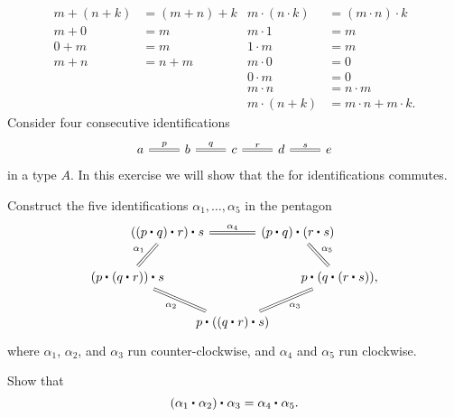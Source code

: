 \begin{exercises}
  \begin{align*}
    m+(n+k) & =(m+n)+k & m\cdot (n\cdot k) & = (m\cdot n)\cdot k \\
    m+0 & = m & m\cdot 1 & = m \\
    0+m & = m & 1\cdot m & = m \\
    m+n & = n+m & m\cdot 0 & = 0 \\
    & & 0 \cdot m & = 0 \\
    & & m\cdot n & = n\cdot m\\
    & & m\cdot (n+k) & = m\cdot n + m\cdot k.
  \end{align*}
\exercise Consider four consecutive identifications
  \begin{equation*}
    \begin{tikzcd}
      a \arrow[r,equals,"p"] & b \arrow[r,equals,"q"] & c \arrow[r,equals,"r"] & d \arrow[r,equals,"s"] & e
    \end{tikzcd}
  \end{equation*}
  in a type $A$. In this exercise we will show that the  for identifications commutes.
  \begin{subexenum}
  \item Construct the five identifications $\alpha_1,\ldots,\alpha_5$ in the pentagon
    \begin{equation*}
      \begin{tikzcd}[column sep=-1.5em]
        &[-2em] \ct{(\ct{(\ct{p}{q})}{r})}{s} \arrow[rr,equals,"\alpha_4"] \arrow[dl,equals,swap,"\alpha_1"] & & \ct{(\ct{p}{q})}{(\ct{r}{s})} \arrow[dr,equals,"\alpha_5"] &[-2em] \\
        \ct{(\ct{p}{(\ct{q}{r})})}{s} \arrow[drr,equals,swap,"\alpha_2"] & & & & \ct{p}{(\ct{q}{(\ct{r}{s})})}, \\
        & & \ct{p}{(\ct{(\ct{q}{r})}{s})} \arrow[urr,equals,swap,"\alpha_3"]
      \end{tikzcd}
    \end{equation*}
    where $\alpha_1$, $\alpha_2$, and $\alpha_3$ run counter-clockwise, and $\alpha_4$ and $\alpha_5$ run clockwise.
  \item Show that
    \begin{equation*}
      \ct{(\ct{\alpha_1}{\alpha_2})}{\alpha_3} = \ct{\alpha_4}{\alpha_5}.
    \end{equation*}
  \end{subexenum}
\end{exercises}

